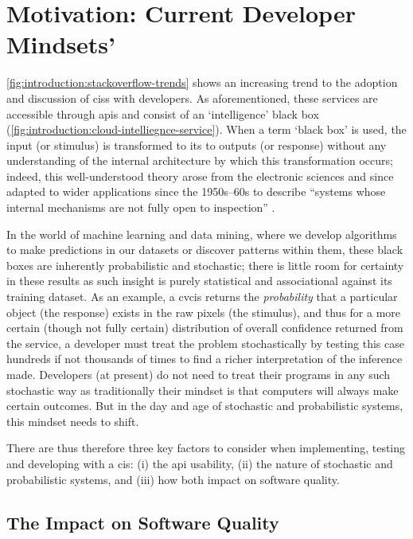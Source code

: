 \section{Motivation: Current Developer Mindsets'}
\label{sec:introduction:motivation}

\cref{fig:introduction:stackoverflow-trends} shows an increasing trend to the adoption and discussion of \glspl{cis} with developers. As aforementioned, these services are accessible through \glspl{api} and consist of an `intelligence' black box (\cref{fig:introduction:cloud-intelliegnce-service}). When a term `black box' is used, the input (or stimulus) is transformed to its to outputs (or response) without any understanding of the internal architecture by which this transformation occurs; indeed, this well-understood theory arose from the electronic sciences and since adapted to wider applications since the 1950s--60s \citep{Ashby:1957db,Bunge:1963jm} to describe ``systems whose internal mechanisms are not fully open to inspection'' \citep{Ashby:1957db}. 

In the world of machine learning and data mining, where we develop algorithms to make predictions in our datasets or discover patterns within them, these black boxes are inherently probabilistic and stochastic; there is little room for certainty in these results as such insight is purely statistical and associational \citep{Pearl:2018uv} against its training dataset. As an example, a \gls{cvcis} returns the \textit{probability} that a particular object (the response) exists in the raw pixels (the stimulus), and thus for a more certain (though not fully certain) distribution of overall confidence returned from the service, a developer must treat the problem stochastically by testing this case hundreds if not thousands of times to find a richer interpretation of the inference made. Developers (at present) do not need to treat their programs in any such stochastic way as traditionally their mindset is that computers will always make certain outcomes. But in the day and age of stochastic and probabilistic systems, this mindset needs to shift.

There are thus therefore three key factors to consider when implementing, testing and developing with a \gls{cis}: (i) the \gls{api} usability, (ii) the nature of stochastic and probabilistic systems, and (iii) how both impact on software quality.

\subsection{The Impact on Software Quality}
\label{ssec:introduction:motivation:impact}

